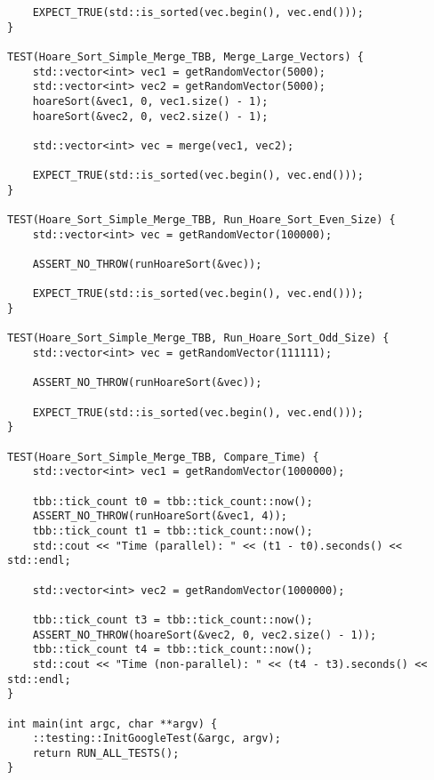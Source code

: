 \documentclass{report}
\begin{document}
\begin{lstlisting}
    EXPECT_TRUE(std::is_sorted(vec.begin(), vec.end()));
}

TEST(Hoare_Sort_Simple_Merge_TBB, Merge_Large_Vectors) {
    std::vector<int> vec1 = getRandomVector(5000);
    std::vector<int> vec2 = getRandomVector(5000);
    hoareSort(&vec1, 0, vec1.size() - 1);
    hoareSort(&vec2, 0, vec2.size() - 1);

    std::vector<int> vec = merge(vec1, vec2);

    EXPECT_TRUE(std::is_sorted(vec.begin(), vec.end()));
}

TEST(Hoare_Sort_Simple_Merge_TBB, Run_Hoare_Sort_Even_Size) {
    std::vector<int> vec = getRandomVector(100000);

    ASSERT_NO_THROW(runHoareSort(&vec));

    EXPECT_TRUE(std::is_sorted(vec.begin(), vec.end()));
}

TEST(Hoare_Sort_Simple_Merge_TBB, Run_Hoare_Sort_Odd_Size) {
    std::vector<int> vec = getRandomVector(111111);

    ASSERT_NO_THROW(runHoareSort(&vec));

    EXPECT_TRUE(std::is_sorted(vec.begin(), vec.end()));
}

TEST(Hoare_Sort_Simple_Merge_TBB, Compare_Time) {
    std::vector<int> vec1 = getRandomVector(1000000);

    tbb::tick_count t0 = tbb::tick_count::now();
    ASSERT_NO_THROW(runHoareSort(&vec1, 4));
    tbb::tick_count t1 = tbb::tick_count::now();
    std::cout << "Time (parallel): " << (t1 - t0).seconds() << std::endl;

    std::vector<int> vec2 = getRandomVector(1000000);

    tbb::tick_count t3 = tbb::tick_count::now();
    ASSERT_NO_THROW(hoareSort(&vec2, 0, vec2.size() - 1));
    tbb::tick_count t4 = tbb::tick_count::now();
    std::cout << "Time (non-parallel): " << (t4 - t3).seconds() << std::endl;
}

int main(int argc, char **argv) {
    ::testing::InitGoogleTest(&argc, argv);
    return RUN_ALL_TESTS();
}

\end{lstlisting}
\end{document}
